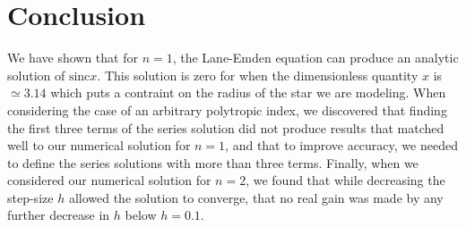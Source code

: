 \documentclass[12pt, manuscript]{article}
\begin{document}
\section*{Conclusion}
We have shown that for $n = 1$, the Lane-Emden equation can produce an analytic solution of $\text{sinc}x$. This solution is zero for when the dimensionless quantity $x$ is $\simeq 3.14$ which puts a contraint on the radius of the star we are modeling. When considering the case of an arbitrary polytropic index, we discovered that finding the first three terms of the series solution did not produce results that matched well to our numerical solution for $n = 1$, and that to improve accuracy, we needed to define the series solutions with more than three terms. Finally, when we considered our numerical solution for $n = 2$, we found that while decreasing the step-size $h$ allowed the solution to converge, that no real gain was made by any further decrease in $h$ below $h = 0.1$.
\end{document}
